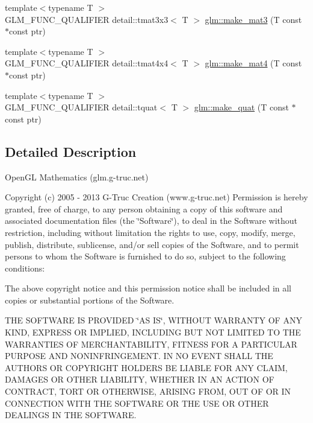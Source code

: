 \begin{DoxyCompactItemize}
\item 
{\footnotesize template$<$typename T $>$ }\\G\+L\+M\+\_\+\+F\+U\+N\+C\+\_\+\+Q\+U\+A\+L\+I\+F\+I\+E\+R detail\+::tmat3x3$<$ T $>$ \hyperlink{group__gtc__type__ptr_gacd8f067b4fb7bd3d48663102b5178ef2}{glm\+::make\+\_\+mat3} (T const $\ast$const ptr)
\item 
{\footnotesize template$<$typename T $>$ }\\G\+L\+M\+\_\+\+F\+U\+N\+C\+\_\+\+Q\+U\+A\+L\+I\+F\+I\+E\+R detail\+::tmat4x4$<$ T $>$ \hyperlink{group__gtc__type__ptr_ga723dd6241d4edf2ad48b25e5007054a7}{glm\+::make\+\_\+mat4} (T const $\ast$const ptr)
\item 
{\footnotesize template$<$typename T $>$ }\\G\+L\+M\+\_\+\+F\+U\+N\+C\+\_\+\+Q\+U\+A\+L\+I\+F\+I\+E\+R detail\+::tquat$<$ T $>$ \hyperlink{group__gtc__type__ptr_ga341b6592d08bc2e3871ceec05e0c060d}{glm\+::make\+\_\+quat} (T const $\ast$const ptr)
\end{DoxyCompactItemize}


\subsection{Detailed Description}
Open\+G\+L Mathematics (glm.\+g-\/truc.\+net)

Copyright (c) 2005 -\/ 2013 G-\/\+Truc Creation (www.\+g-\/truc.\+net) Permission is hereby granted, free of charge, to any person obtaining a copy of this software and associated documentation files (the \char`\"{}\+Software\char`\"{}), to deal in the Software without restriction, including without limitation the rights to use, copy, modify, merge, publish, distribute, sublicense, and/or sell copies of the Software, and to permit persons to whom the Software is furnished to do so, subject to the following conditions\+:

The above copyright notice and this permission notice shall be included in all copies or substantial portions of the Software.

T\+H\+E S\+O\+F\+T\+W\+A\+R\+E I\+S P\+R\+O\+V\+I\+D\+E\+D \char`\"{}\+A\+S I\+S\char`\"{}, W\+I\+T\+H\+O\+U\+T W\+A\+R\+R\+A\+N\+T\+Y O\+F A\+N\+Y K\+I\+N\+D, E\+X\+P\+R\+E\+S\+S O\+R I\+M\+P\+L\+I\+E\+D, I\+N\+C\+L\+U\+D\+I\+N\+G B\+U\+T N\+O\+T L\+I\+M\+I\+T\+E\+D T\+O T\+H\+E W\+A\+R\+R\+A\+N\+T\+I\+E\+S O\+F M\+E\+R\+C\+H\+A\+N\+T\+A\+B\+I\+L\+I\+T\+Y, F\+I\+T\+N\+E\+S\+S F\+O\+R A P\+A\+R\+T\+I\+C\+U\+L\+A\+R P\+U\+R\+P\+O\+S\+E A\+N\+D N\+O\+N\+I\+N\+F\+R\+I\+N\+G\+E\+M\+E\+N\+T. I\+N N\+O E\+V\+E\+N\+T S\+H\+A\+L\+L T\+H\+E A\+U\+T\+H\+O\+R\+S O\+R C\+O\+P\+Y\+R\+I\+G\+H\+T H\+O\+L\+D\+E\+R\+S B\+E L\+I\+A\+B\+L\+E F\+O\+R A\+N\+Y C\+L\+A\+I\+M, D\+A\+M\+A\+G\+E\+S O\+R O\+T\+H\+E\+R L\+I\+A\+B\+I\+L\+I\+T\+Y, W\+H\+E\+T\+H\+E\+R I\+N A\+N A\+C\+T\+I\+O\+N O\+F C\+O\+N\+T\+R\+A\+C\+T, T\+O\+R\+T O\+R O\+T\+H\+E\+R\+W\+I\+S\+E, A\+R\+I\+S\+I\+N\+G F\+R\+O\+M, O\+U\+T O\+F O\+R I\+N C\+O\+N\+N\+E\+C\+T\+I\+O\+N W\+I\+T\+H T\+H\+E S\+O\+F\+T\+W\+A\+R\+E O\+R T\+H\+E U\+S\+E O\+R O\+T\+H\+E\+R D\+E\+A\+L\+I\+N\+G\+S I\+N T\+H\+E S\+O\+F\+T\+W\+A\+R\+E.

